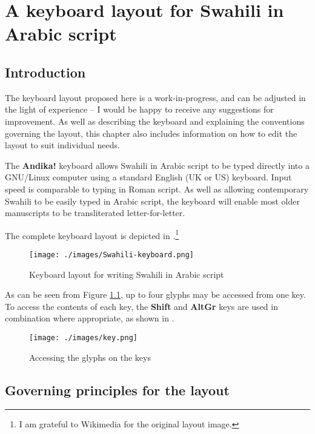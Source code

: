 \chapter{A keyboard layout for Swahili in Arabic script}
\label{ch:keyboard}

\section{Introduction}

The keyboard layout proposed here is a work-in-progress, and can be adjusted in the light of experience -- I would be happy to receive any suggestions for improvement.  As well as describing the keyboard and explaining the conventions governing the layout, this chapter also includes information on how to edit the layout to suit individual needs.

The \textbf{Andika!} keyboard allows Swahili in Arabic script to be typed directly into a GNU/Linux computer using a standard English (UK or US) keyboard. Input speed is comparable to typing in Roman script.  As well as allowing contemporary Swahili to be easily typed in Arabic script, the keyboard will enable most older manuscripts to be transliterated letter-for-letter.

The complete keyboard layout is depicted in .\footnote{I am grateful to Wikimedia for the original layout image.} 

\begin{figure}[!ht]
 \centering
 \texttt{[image: ./images/Swahili-keyboard.png]}
 \caption{Keyboard layout for writing Swahili in Arabic script}
 \label{fig:kblayout}
\end{figure}

As can be seen from Figure \ref{fig:kblayout}, up to four glyphs may be accessed from one key.  To access the contents of each key, the \textbf{Shift} and \textbf{AltGr} keys are used in combination where appropriate, as shown in .

\begin{figure}[!ht]
 \centering
 \texttt{[image: ./images/key.png]}
 \caption{Accessing the glyphs on the keys}
 \label{fig:key}
\end{figure}

\section{Governing principles for the layout}

